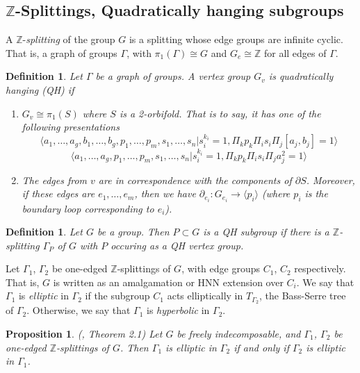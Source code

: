 \documentclass[12pt]{amsart}
\newtheorem{proposition}[theorem]{Proposition}
\newtheorem{definition}[theorem]{Definition}
\newcommand{\Z}{\mathbb{Z}}
\begin{document}
\subsection{$\Z$-Splittings, Quadratically hanging subgroups}

A $\Z$-{\em splitting} of the group $G$ is a splitting whose edge groups are infinite cyclic. That is, a graph of groups $\Gamma$, with $\pi_1(\Gamma)\cong G$ and $G_e\cong\Z$ for all edges of $\Gamma$.

\begin{definition} \label{QH} Let $\Gamma$ be a graph of groups. A vertex group $G_v$ is {\em quadratically hanging} (QH) if
\begin{enumerate}
\item $G_v \cong \pi_1(S)$ where $S$ is a 2-orbifold. That is to say, it has one of the following presentations
\[ \langle a_1,\ldots,a_g,b_1,\ldots,b_g,p_1,\ldots,p_m,s_1,\ldots,s_n | s_i^{k_i}=1, \Pi_k p_k \Pi_i s_i \Pi_j [a_j,b_j] =1 \rangle \]
\[ \langle a_1,\ldots,a_g,p_1,\ldots,p_m,s_1,\ldots,s_n | s_i^{k_i}=1, \Pi_k p_k \Pi_i s_i \Pi_j a_j^2 =1 \rangle \]

\item The edges from $v$ are in correspondence with the components of $\partial S$. Moreover, if these edges are $e_1,\ldots,e_m$, then we have $\partial_{e_i}:G_{e_i} \to \langle p_i \rangle$ (where $p_i$ is the boundary loop corresponding to $e_i$). 
\end{enumerate}
\end{definition}

\begin{definition} Let $G$ be a group. Then $P\subset G$ is a {\em QH subgroup} if there is a $\Z$-splitting $\Gamma_P$ of $G$ with $P$ occuring as a QH vertex group.
\end{definition}


Let $\Gamma_1$, $\Gamma_2$ be one-edged $\Z$-splittings of $G$, with edge groups $C_1$, $C_2$ respectively. That is, $G$ is written as an amalgamation or HNN extension over $C_i$. We say that $\Gamma_1$ is {\em elliptic} in $\Gamma_2$ if the subgroup $C_1$ acts elliptically in $T_{\Gamma_2}$, the Bass-Serre tree of $\Gamma_2$. Otherwise, we say that $\Gamma_1$ is {\em hyperbolic} in $\Gamma_2$.

\begin{proposition} (\cite{ripsela}, Theorem 2.1) Let $G$ be freely indecomposable, and $\Gamma_1$, $\Gamma_2$ be one-edged $\Z$-splittings of $G$.  Then $\Gamma_1$ is elliptic in $\Gamma_2$ if and only if $\Gamma_2$ is elliptic in $\Gamma_1$.
\end{proposition}
\end{document}
